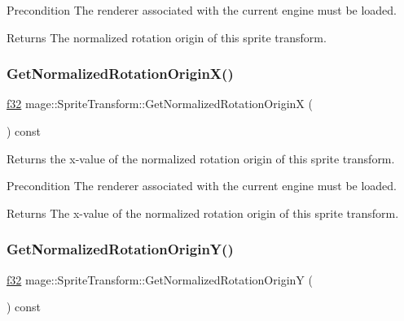 \begin{DoxyPrecond}{Precondition}
The renderer associated with the current engine must be loaded. 
\end{DoxyPrecond}
\begin{DoxyReturn}{Returns}
The normalized rotation origin of this sprite transform. 
\end{DoxyReturn}
\hypertarget{structmage_1_1_sprite_transform_a65b1fea4bfe77b8bdf804d2d8a93b213}{}\label{structmage_1_1_sprite_transform_a65b1fea4bfe77b8bdf804d2d8a93b213} 
\subsubsection{\texorpdfstring{Get\+Normalized\+Rotation\+Origin\+X()}{GetNormalizedRotationOriginX()}}
{\footnotesize\ttfamily \hyperlink{namespacemage_a6a44ad388483959dc4dff9f2aef91431}{f32} mage\+::\+Sprite\+Transform\+::\+Get\+Normalized\+Rotation\+OriginX (\begin{DoxyParamCaption}{ }\end{DoxyParamCaption}) const}

Returns the x-\/value of the normalized rotation origin of this sprite transform.

\begin{DoxyPrecond}{Precondition}
The renderer associated with the current engine must be loaded. 
\end{DoxyPrecond}
\begin{DoxyReturn}{Returns}
The x-\/value of the normalized rotation origin of this sprite transform. 
\end{DoxyReturn}
\hypertarget{structmage_1_1_sprite_transform_aadedc31aa6d7145b40dc0d1e2e9a7038}{}\label{structmage_1_1_sprite_transform_aadedc31aa6d7145b40dc0d1e2e9a7038} 
\subsubsection{\texorpdfstring{Get\+Normalized\+Rotation\+Origin\+Y()}{GetNormalizedRotationOriginY()}}
{\footnotesize\ttfamily \hyperlink{namespacemage_a6a44ad388483959dc4dff9f2aef91431}{f32} mage\+::\+Sprite\+Transform\+::\+Get\+Normalized\+Rotation\+OriginY (\begin{DoxyParamCaption}{ }\end{DoxyParamCaption}) const}

